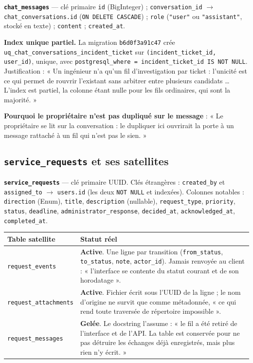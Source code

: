 \documentclass[11pt,a4paper]{report}
\newcommand{\file}[1]{\texttt{\small #1}}
\newcommand{\tbl}[1]{\texttt{\small\textcolor{oasisamber}{#1}}}
\newcommand{\arrowto}{\ensuremath{\rightarrow}}
\begin{document}
\textbf{\tbl{chat\_messages}} --- clé primaire \texttt{id} (BigInteger) ;
\texttt{conversation\_id} \arrowto{} \texttt{chat\_conversations.id}
(\texttt{ON DELETE CASCADE}) ; \texttt{role} (\texttt{"user"} ou
\texttt{"assistant"}, stocké en texte) ; \texttt{content} ; \texttt{created\_at}.

\begin{keybox}
\textbf{Index unique partiel.} La migration \file{b6d0f3a91c47} crée
\texttt{uq\_chat\_conversations\_incident\_ticket} sur
\texttt{(incident\_ticket\_id, user\_id)}, unique, avec
\texttt{postgresql\_where = incident\_ticket\_id IS NOT NULL}. Justification :
« Un ingénieur n'a qu'un fil d'investigation par ticket : l'unicité est ce qui
permet de rouvrir l'existant sans arbitrer entre plusieurs candidats \ldots{}
L'index est partiel, la colonne étant nulle pour les fils ordinaires, qui sont
la majorité. »
\end{keybox}

\noindent
\textbf{Pourquoi le propriétaire n'est pas dupliqué sur le message} : « Le
propriétaire se lit sur la conversation : le dupliquer ici ouvrirait la porte à
un message rattaché à un fil qui n'est pas le sien. »

\subsection{\tbl{service\_requests} et ses satellites}

\textbf{\tbl{service\_requests}} --- clé primaire UUID.
Clés étrangères : \texttt{created\_by} et \texttt{assigned\_to} \arrowto{}
\texttt{users.id} (les deux \texttt{NOT NULL} et indexées).
Colonnes notables : \texttt{direction} (Enum), \texttt{title},
\texttt{description} (nullable), \texttt{request\_type}, \texttt{priority},
\texttt{status}, \texttt{deadline}, \texttt{administrator\_response},
\texttt{decided\_at}, \texttt{acknowledged\_at}, \texttt{completed\_at}.

\begin{longtable}{@{}p{4.0cm}p{10.8cm}@{}}
\toprule
\textbf{Table satellite} & \textbf{Statut réel}\\
\midrule
\endhead
\tbl{request\_events} & \textbf{Active}. Une ligne par transition (\texttt{from\_status}, \texttt{to\_status}, \texttt{note}, \texttt{actor\_id}). Jamais renvoyée au client : « l'interface se contente du statut courant et de son horodatage ».\\
\tbl{request\_attachments} & \textbf{Active}. Fichier écrit sous l'UUID de la ligne ; le nom d'origine ne survit que comme métadonnée, « ce qui rend toute traversée de répertoire impossible ».\\
\tbl{request\_messages} & \textbf{Gelée}. Le docstring l'assume : « le fil a été retiré de l'interface et de l'API. La table est conservée pour ne pas détruire les échanges déjà enregistrés, mais plus rien n'y écrit. »\\
\bottomrule
\end{longtable}
\end{document}
